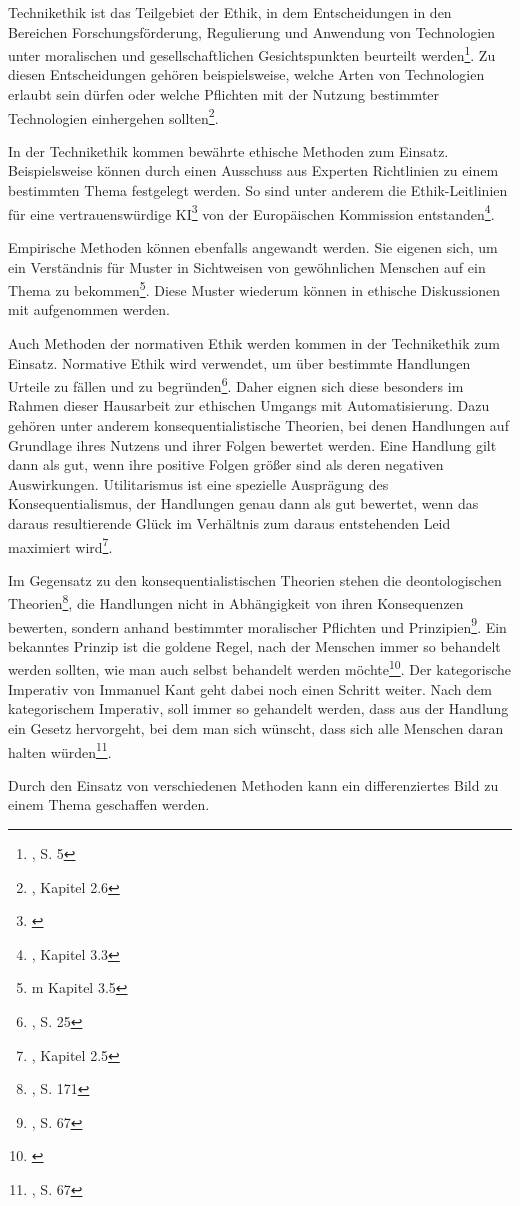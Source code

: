 Technikethik ist das Teilgebiet der Ethik, in dem Entscheidungen in den Bereichen Forschungsförderung, Regulierung und Anwendung von Technologien unter moralischen und gesellschaftlichen Gesichtspunkten beurteilt werden\footnote{\cite{Grunwald.2021}, S. 5}. Zu diesen Entscheidungen gehören beispielsweise, welche Arten von Technologien erlaubt sein dürfen oder welche Pflichten mit der Nutzung bestimmter Technologien einhergehen sollten\footnote{\cite{Nyholm.2023}, Kapitel 2.6}.

In der Technikethik kommen bewährte ethische Methoden zum Einsatz. Beispielsweise können durch einen Ausschuss aus Experten Richtlinien zu einem bestimmten Thema festgelegt werden. So sind unter anderem die \glqq Ethik-Leitlinien für eine vertrauenswürdige KI\grqq\footnote{\cite{EuropeanCommission:EthicsguidelinesfortrustworthyAI.2019}} von der Europäischen Kommission entstanden\footnote{\cite{Nyholm.2023}, Kapitel 3.3}.

Empirische Methoden können ebenfalls angewandt werden. Sie eigenen sich, um ein Verständnis für Muster in Sichtweisen von gewöhnlichen Menschen auf ein Thema zu bekommen\footnote{\cite{Nyholm.2023}m Kapitel 3.5}. Diese Muster wiederum können in ethische Diskussionen mit aufgenommen werden.

Auch Methoden der normativen Ethik werden kommen in der Technikethik zum Einsatz. Normative Ethik wird verwendet, um über bestimmte Handlungen Urteile zu fällen und zu begründen\footnote{\cite{Duwell.2011}, S. 25}. Daher eignen sich diese besonders im Rahmen dieser Hausarbeit zur ethischen Umgangs mit Automatisierung. Dazu gehören unter anderem konsequentialistische Theorien, bei denen Handlungen auf Grundlage ihres Nutzens und ihrer Folgen bewertet werden. Eine Handlung gilt dann als gut, wenn ihre positive Folgen größer sind als deren negativen Auswirkungen. Utilitarismus ist eine spezielle Ausprägung des Konsequentialismus, der Handlungen genau dann als gut bewertet, wenn das daraus resultierende Glück im Verhältnis zum daraus entstehenden Leid maximiert wird\footnote{\cite{Nyholm.2023}, Kapitel 2.5}.

Im Gegensatz zu den konsequentialistischen Theorien stehen die deontologischen Theorien\footnote{\cite{Grunwald.2021}, S. 171}, die Handlungen nicht in Abhängigkeit von ihren Konsequenzen bewerten, sondern anhand bestimmter moralischer Pflichten und Prinzipien\footnote{\cite{Neuhauser.2023}, S. 67}. Ein bekanntes Prinzip ist die goldene Regel, nach der Menschen immer so behandelt werden sollten, wie man auch selbst behandelt werden möchte\footnote{\cite{Baggini.2014}}. Der kategorische Imperativ von Immanuel Kant geht dabei noch einen Schritt weiter. Nach dem kategorischem Imperativ, soll immer so gehandelt werden, dass aus der Handlung ein Gesetz hervorgeht, bei dem man sich wünscht, dass sich alle Menschen daran halten würden\footnote{\cite{Neuhauser.2023}, S. 67}.

Durch den Einsatz von verschiedenen Methoden kann ein differenziertes Bild zu einem Thema geschaffen werden. 